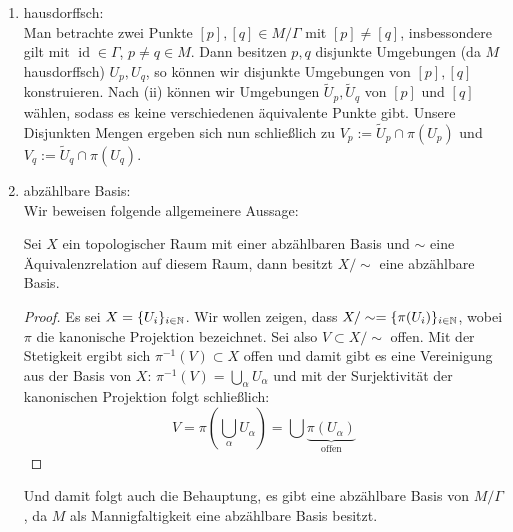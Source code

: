 \documentclass{scrartcl}
\newcommand{\id}{\operatorname{id}}
\begin{document}
\begin{aufgabe}
\begin{enumerate}
\item hausdorffsch:\\
Man betrachte zwei Punkte $ [p],[q] \in M/\Gamma $ mit $ [p]\neq [q] $, insbessondere gilt mit $ \id \in \Gamma $, $ p\neq q \in M $.  Dann besitzen  $ p,q $ disjunkte Umgebungen (da $ M $ hausdorffsch) $ U_p, U_q $, so können wir disjunkte Umgebungen von $ [p], [q] $ konstruieren. Nach (ii) können wir Umgebungen $ \tilde U_p, \tilde U_q $ von $ [p] $ und $ [q] $ wählen, sodass es keine verschiedenen äquivalente Punkte gibt. Unsere Disjunkten Mengen ergeben sich nun schließlich zu $ V_p:= \tilde U_p \cap \pi(U_p)  $ und $ V_q:= \tilde U_q \cap \pi(U_q) $. 
\item abzählbare Basis:\\
Wir beweisen folgende allgemeinere Aussage:
\begin{lem*}
Sei $ X $ ein topologischer Raum mit einer abzählbaren Basis  und $ \sim $ eine Äquivalenzrelation auf diesem Raum, dann besitzt $ X/\sim $ eine abzählbare Basis. 
\end{lem*} 
\begin{proof}
Es sei $ X=\{U_i\}_{i\in \mathbb{N}} $.  Wir wollen zeigen, dass $ X/\sim = \{\pi(U_i)\}_{i\in \mathbb{N}} $, wobei $ \pi $ die kanonische Projektion bezeichnet. Sei also $ V\subset X/\sim  $ offen.  Mit der Stetigkeit ergibt sich $ \pi^{-1}(V) \subset X $ offen und damit gibt es eine Vereinigung aus der Basis von $ X $: $ \pi^{-1}(V)=\bigcup_\alpha U_\alpha $ und mit der Surjektivität der kanonischen Projektion folgt schließlich:
\[
V=\pi\left(\bigcup_\alpha U_\alpha\right)=\bigcup \underbrace{\pi(U_\alpha)}_{\text{offen}}
\]
\end{proof}
Und damit folgt auch die Behauptung, es gibt eine abzählbare Basis von $ M/\Gamma $, da $ M $ als Mannigfaltigkeit eine abzählbare Basis besitzt.
\end{enumerate}
\end{aufgabe}
\end{document}
